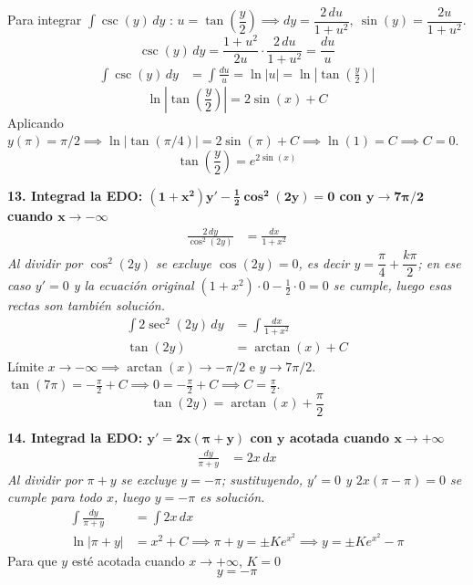 \documentclass[11pt, a4paper]{article}
\begin{document}
Para integrar $\int \csc(y)\,dy$ : $u=\tan\left(\dfrac{y}{2}\right) \implies dy=\dfrac{2\,du}{1+u^2},\ \sin(y)=\dfrac{2u}{1+u^2}$.
\[
\csc(y)\,dy = \frac{1+u^2}{2u}\cdot\frac{2\,du}{1+u^2} = \frac{du}{u}
\]
\begin{align*}
\int \csc(y)\,dy &= \int \frac{du}{u} = \ln|u| = \ln\left|\tan\left(\frac{y}{2}\right)\right|
\end{align*}
\[
\ln\left|\tan\left(\frac{y}{2}\right)\right| = 2\sin(x) + C
\]
Aplicando $y(\pi)=\pi/2 \implies \ln|\tan(\pi/4)| = 2\sin(\pi)+C \implies \ln(1) = C \implies C=0$.
\[
\boxed{\tan\left(\frac{y}{2}\right) = e^{2\sin(x)}}
\]


\noindent\textbf{13. Integrad la EDO: $\bm{(1+x^2)y' - \frac{1}{2}\cos^2(2y) = 0}$ con $\bm{y \to 7\pi/2}$ cuando $\bm{x \to -\infty}$} \\
\begin{align*}
\frac{2\,dy}{\cos^2(2y)} &= \frac{dx}{1+x^2}
\end{align*}
\textit{Al dividir por $\cos^2(2y)$ se excluye $\cos(2y)=0$, es decir $y=\dfrac{\pi}{4}+\dfrac{k\pi}{2}$; en ese caso $y'=0$ y la ecuación original $(1+x^2)\cdot0-\frac12\cdot0=0$ se cumple, luego esas rectas son también solución.}
\begin{align*}
\int 2\sec^2(2y)\,dy &= \int \frac{dx}{1+x^2} \\
\tan(2y) &= \arctan(x) + C
\end{align*}
Límite $x \to -\infty \implies \arctan(x) \to -\pi/2$ e $y \to 7\pi/2$. \\
$\tan(7\pi) = -\frac{\pi}{2} + C \implies 0 = -\frac{\pi}{2} + C \implies C = \frac{\pi}{2}$.
\[
\boxed{\tan(2y) = \arctan(x) + \frac{\pi}{2}}
\]


\noindent\textbf{14. Integrad la EDO: $\bm{y' = 2x(\pi+y)}$ con $\bm{y}$ acotada cuando $\bm{x \to +\infty}$} \\
\begin{align*}
\frac{dy}{\pi+y} &= 2x\,dx
\end{align*}
\textit{Al dividir por $\pi+y$ se excluye $y=-\pi$; sustituyendo, $y'=0$ y $2x(\pi-\pi)=0$ se cumple para todo $x$, luego $y=-\pi$ es solución.}
\begin{align*}
\int \frac{dy}{\pi+y} &= \int 2x\,dx \\
\ln|\pi+y| &= x^2 + C \implies \pi+y = \pm K e^{x^2} \implies y = \pm K e^{x^2} - \pi
\end{align*}
Para que $y$ esté acotada cuando $x \to +\infty$, $K=0$
\[
\boxed{y = -\pi}
\]
\end{document}
